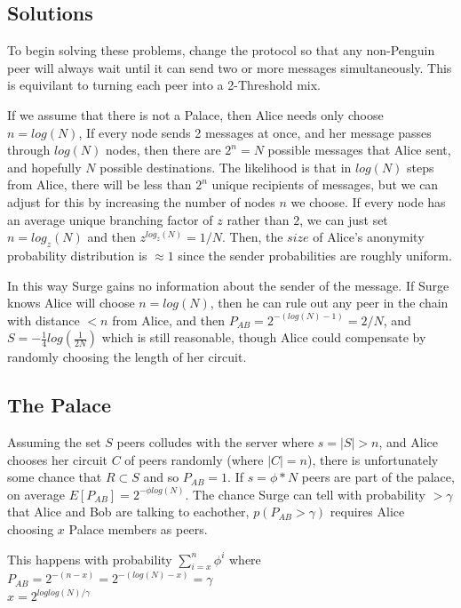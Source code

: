 \documentclass{paper}
\begin{document}
\subsection{Solutions}
To begin solving these problems, change the protocol so that any non-Penguin peer will always wait until it can send two or more messages simultaneously. This is equivilant to turning each peer into a 2-Threshold mix. \cite{TODO}

If we assume that there is not a Palace, then Alice needs only choose $n = log(N)$, If every node sends 2 messages at once, and her message passes through $log(N)$ nodes, then there are $2^n = N$ possible messages that Alice sent, and hopefully $N$ possible destinations. The likelihood is that in $log(N)$ steps from Alice, there will be less than $2^n$ unique recipients of messages, but we can adjust for this by increasing the number of nodes $n$ we choose. If every node has an average unique branching factor of $z$ rather than $2$, we can just set $n = log_z(N)$ and then $z^{log_z(N)} = 1/N$. Then, the $size$ of Alice's anonymity probability distribution is $\approx 1$ since the sender probabilities are roughly uniform.

In this way Surge gains no information about the sender of the message. If Surge knows Alice will choose $n = log(N)$, then he can rule out any peer in the chain with distance $< n$ from Alice, and then $P_{AB} = 2^{-(log(N)-1)} = 2/N$, and $S = - \frac{1}{4} log(\frac{1}{2N})$ which is still reasonable, though Alice could compensate by randomly choosing the length of her circuit. 

\subsection{The Palace} Assuming the set $S$ peers colludes with the server where $s = |S| > n$, and Alice chooses her circuit $C$ of peers randomly (where $|C| = n$), there is unfortunately some chance that $R \subset S$ and so $P_{AB} = 1$. If $s = \phi*N$ peers are part of the palace, on average $E[P_{AB}] = 2^{-\phi log(N)}$. The chance Surge can tell with probability $> \gamma$ that Alice and Bob are talking to eachother, $p(P_{AB} > \gamma)$ requires Alice choosing $x$ Palace members as peers. 

This happens with probability $\sum\limits_{i=x}^n\phi^i$ where 
\\ $P_{AB} = 2^{-(n - x)} = 2^{-(log(N) - x)} = \gamma$
\\ $x = 2^{loglog(N)/\gamma}$
\end{document}
